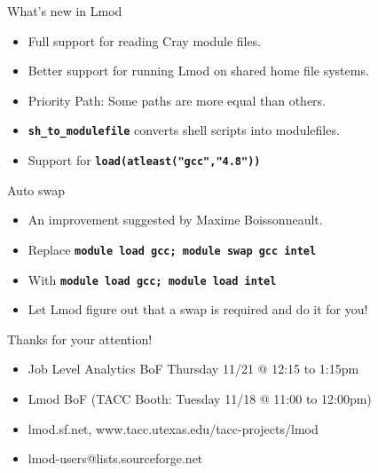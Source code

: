 \documentclass{beamer}
\begin{document}

\begin{frame}{What's new in Lmod}
  \begin{itemize}
      \item Full support for reading Cray module files.
      \item Better support for running Lmod on shared home file systems.
      \item Priority Path: Some paths are more equal than others.
      \item \texttt{\bf sh\_to\_modulefile} converts shell scripts into modulefiles.
      \item Support for \texttt{\bf load(atleast("gcc","4.8"))}
  \end{itemize}
\end{frame}

\begin{frame}{Auto swap}
  \begin{itemize}
      \item An improvement suggested by Maxime Boissonneault.
      \item Replace \texttt{\bf module load gcc; module swap gcc intel}
      \item With \texttt{\bf module load gcc; module load intel}
      \item Let Lmod figure out that a swap is required and do it for you!
  \end{itemize}
\end{frame}
\begin{frame}{Thanks for your attention!}
  \begin{itemize}
    \item Job Level Analytics BoF Thursday 11/21 @ 12:15 to 1:15pm
    \item Lmod BoF (TACC Booth:  Tuesday 11/18 @ 11:00 to 12:00pm)
    \item lmod.sf.net, www.tacc.utexas.edu/tacc-projects/lmod
    \item lmod-users@lists.sourceforge.net
  \end{itemize}
\end{frame}
\end{document}
